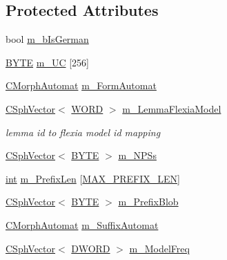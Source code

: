 \subsection*{Protected Attributes}
\begin{DoxyCompactItemize}
\item 
bool \hyperlink{classCLemmatizer_aee78b345c6cb1475f6d61f38ed948698}{m\-\_\-b\-Is\-German}
\item 
\hyperlink{sphinxstd_8h_a4ae1dab0fb4b072a66584546209e7d58}{B\-Y\-T\-E} \hyperlink{classCLemmatizer_a5b90b2010d69693a7e096235db1c28cd}{m\-\_\-\-U\-C} \mbox{[}256\mbox{]}
\item 
\hyperlink{classCMorphAutomat}{C\-Morph\-Automat} \hyperlink{classCLemmatizer_a53eefd483fbc7b6f434d0f82818035db}{m\-\_\-\-Form\-Automat}
\item 
\hyperlink{classCSphVector}{C\-Sph\-Vector}$<$ \hyperlink{sphinxstd_8h_a197942eefa7db30960ae396d68339b97}{W\-O\-R\-D} $>$ \hyperlink{classCLemmatizer_aff1ef9346f58dc6ce9dd2d9c2e8e3930}{m\-\_\-\-Lemma\-Flexia\-Model}
\begin{DoxyCompactList}\small\item\em lemma id to flexia model id mapping \end{DoxyCompactList}\item 
\hyperlink{classCSphVector}{C\-Sph\-Vector}$<$ \hyperlink{sphinxstd_8h_a4ae1dab0fb4b072a66584546209e7d58}{B\-Y\-T\-E} $>$ \hyperlink{classCLemmatizer_a8ed8787ab19324a82b4aae5d19134623}{m\-\_\-\-N\-P\-Ss}
\item 
\hyperlink{sphinxexpr_8cpp_a4a26e8f9cb8b736e0c4cbf4d16de985e}{int} \hyperlink{classCLemmatizer_a534943c29beda648c14a504261315053}{m\-\_\-\-Prefix\-Len} \mbox{[}\hyperlink{classCLemmatizer_a741c02dd57aa5794e6f197f9d533fac4}{M\-A\-X\-\_\-\-P\-R\-E\-F\-I\-X\-\_\-\-L\-E\-N}\mbox{]}
\item 
\hyperlink{classCSphVector}{C\-Sph\-Vector}$<$ \hyperlink{sphinxstd_8h_a4ae1dab0fb4b072a66584546209e7d58}{B\-Y\-T\-E} $>$ \hyperlink{classCLemmatizer_a7ea2f362b36f23c127736d67360d8fa7}{m\-\_\-\-Prefix\-Blob}
\item 
\hyperlink{classCMorphAutomat}{C\-Morph\-Automat} \hyperlink{classCLemmatizer_aa1098b2b33498d4c9f332aa8cb08b26e}{m\-\_\-\-Suffix\-Automat}
\item 
\hyperlink{classCSphVector}{C\-Sph\-Vector}$<$ \hyperlink{sphinxstd_8h_a798af1e30bc65f319c1a246cecf59e39}{D\-W\-O\-R\-D} $>$ \hyperlink{classCLemmatizer_a3951deca7374102dd11f0da82c58483c}{m\-\_\-\-Model\-Freq}
\end{DoxyCompactItemize}
